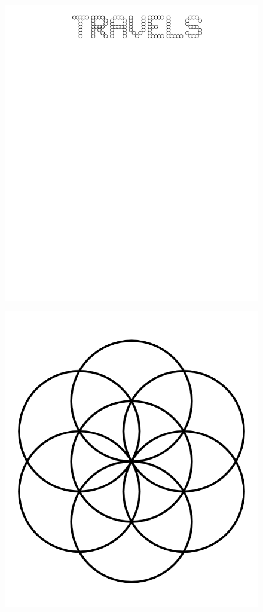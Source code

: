 \documentclass[17pt]{extreport}
\begin{document}
	 \begin{figure}
		\centering
		\includegraphics[width=6.25in]{imageserver/uploadimages/travels.png}
	\end{figure}
	\begin{figure}
		\centering
		\includegraphics[width=6.25in]{imageserver/uploadimages/circles6.png}
	\end{figure}	
\end{document}
